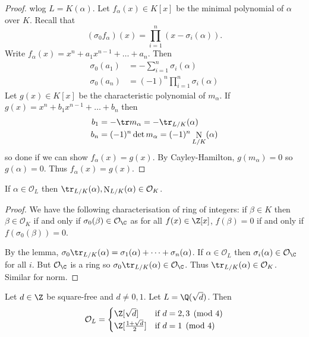\documentclass[a4paper]{article}
\renewcommand*{\O}{\mathcal{O}}
\DeclareMathOperator{\n}{N}
\begin{document}
\begin{proof}
  wlog \(L = K(\alpha)\). Let \(f_\alpha(x) \in K[x]\) be the minimal polynomial of \(\alpha\) over \(K\). Recall that
  \[
    (\sigma_0f_\alpha)(x) = \prod_{i = 1}^n (x - \sigma_i(\alpha)).
  \]
  Write \(f_\alpha(x) = x^n + a_1x^{n - 1} + \dots + a_n\). Then
  \begin{align*}
    \sigma_0(a_1) &= - \sum_{i = 1}^n \sigma_i(\alpha) \\
    \sigma_0(a_n) &= (-1)^n \prod_{i = 1}^n \sigma_i(\alpha)
  \end{align*}
  Let \(g(x) \in K[x]\) be the characteristic polynomial of \(m_\alpha\). If \(g(x) = x^n + b_1x^{n - 1} + \dots + b_n\) then
  \begin{align*}
    b_1 &= -\tr m_\alpha = -\tr_{L/K}(\alpha) \\
    b_n &= (-1)^n\det m_\alpha = (-1)^n \n_{L/K}(\alpha)
  \end{align*}
  so done if we can show \(f_\alpha(x) = g(x)\). By Cayley-Hamilton, \(g(m_\alpha) = 0\) so \(g(\alpha) = 0\). Thus \(f_\alpha(x) = g(x)\).
\end{proof}

\begin{corollary}
  If \(\alpha \in \O_L\) then \(\tr_{L/K}(\alpha), \n_{L/K}(\alpha) \in \O_K\).
\end{corollary}

\begin{proof}
  We have the following characterisation of ring of integers: if \(\beta \in K\) then \(\beta \in \O_K\) if and only if \(\sigma_0(\beta) \in \O_\C\) as for all \(f(x) \in \Z[x]\), \(f(\beta) = 0\) if and only if \(f(\sigma_0(\beta)) = 0\).

  By the lemma, \(\sigma_0 \tr_{L/K}(\alpha) = \sigma_1(\alpha) + \dots + \sigma_n(\alpha)\). If \(\alpha \in \O_L\) then \(\sigma_i(\alpha) \in \O_\C\) for all \(i\). But \(\O_\C\) is a ring so \(\sigma_0 \tr_{L/K}(\alpha) \in \O_\C\). Thus \(\tr_{L/K}(\alpha) \in \O_K\). Similar for norm.
\end{proof}

\begin{proposition}
  Let \(d \in \Z\) be square-free and \(d \neq 0, 1\). Let \(L = \Q(\sqrt d)\). Then
  \[
    \O_L =
    \begin{cases}
      \Z[\sqrt d] & \text{if } d = 2, 3 \pmod 4 \\
      \Z[\frac{1 + \sqrt d}{2}] & \text{if } d = 1 \pmod 4
    \end{cases}
  \]
\end{proposition}
\end{document}
